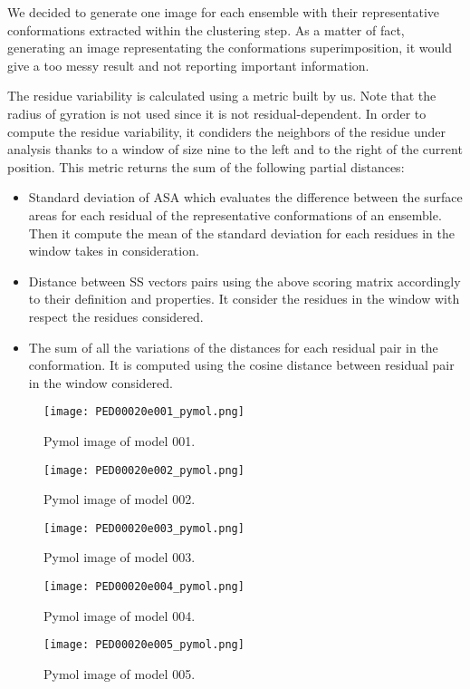 We decided to generate one image for each ensemble with their representative conformations extracted within the clustering step.
As a matter of fact, generating an image representating the conformations superimposition, it would give a too messy result and not reporting important information.

The residue variability is calculated using a metric built by us. Note that the radius of gyration is not used since it is not residual-dependent.
In order to compute the residue variability, it condiders the neighbors of the residue under analysis thanks to a window of size nine to the left and to the right of the current position.
This metric returns the sum of the following partial distances:
\begin{itemize}
\item Standard deviation of ASA which evaluates the difference between the surface areas for each residual of the representative conformations of an ensemble. Then it compute the mean of the standard deviation for each residues in the window takes in consideration.
\item Distance between SS vectors pairs using the above scoring matrix accordingly to their definition and properties. It consider the residues in the window with respect the residues considered.
\item The sum of all the variations of the distances for each residual pair in the conformation. It is computed using the cosine distance between residual pair in the window considered. 
\end{itemize}

\begin{figure}[H]
	\begin{minipage}[b]{0.97\textwidth}
		\centering
		\texttt{[image: PED00020e001\_pymol.png]}
		\caption{Pymol image of model 001.}
		\label{model001p}
	\end{minipage}
	\begin{minipage}[b]{0.97\textwidth}
		\centering
		\texttt{[image: PED00020e002\_pymol.png]}
		\caption{Pymol image of model 002.}
		\label{model002p}
	\end{minipage}
\end{figure}
\begin{figure}[H]
	\begin{minipage}[b]{0.99\textwidth}
		\centering
		\texttt{[image: PED00020e003\_pymol.png]}
		\caption{Pymol image of model 003.}
		\label{model003p}
	\end{minipage}
	\begin{minipage}[b]{0.99\textwidth}
		\centering
		\texttt{[image: PED00020e004\_pymol.png]}
		\caption{Pymol image of model 004.}
		\label{model004p}
	\end{minipage}
	\begin{minipage}[b]{0.99\textwidth}
		\centering
		\texttt{[image: PED00020e005\_pymol.png]}
		\caption{Pymol image of model 005.}
		\label{model005p}
	\end{minipage}
\end{figure}

